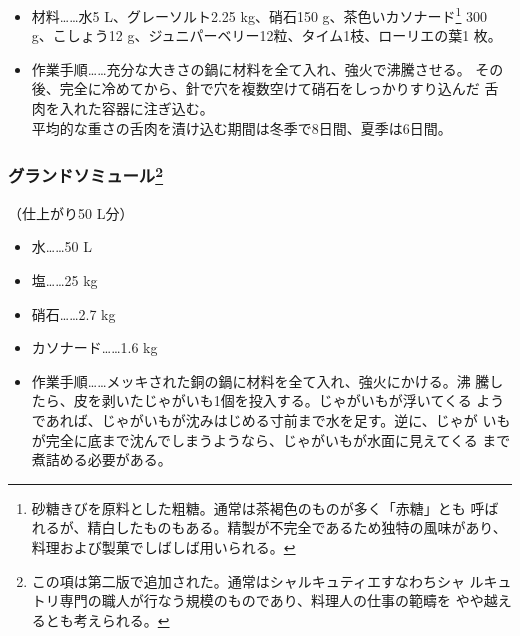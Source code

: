 \begin{recette}


\begin{itemize}
\item
  材料\ldots{}\ldots{}水5 L、グレーソルト2.25 kg、硝石150
  g、茶色いカソナード\footnote{砂糖きびを原料とした粗糖。通常は茶褐色のものが多く「赤糖」とも
    呼ばれるが、精白したものもある。精製が不完全であるため独特の風味があり、
    料理および製菓でしばしば用いられる。} 300 g、こしょう12
  g、ジュニパーベリー12粒、タイム1枝、ローリエの葉1 枚。
\item
  作業手順\ldots{}\ldots{}充分な大きさの鍋に材料を全て入れ、強火で沸騰させる。
  その後、完全に冷めてから、針で穴を複数空けて硝石をしっかりすり込んだ
  舌肉を入れた容器に注ぎ込む。\\
  平均的な重さの舌肉を漬け込む期間は冬季で8日間、夏季は6日間。
\end{itemize}

\hypertarget{grande-saumure}{%
\subsubsection[グランドソミュール]{\texorpdfstring{グランドソミュール\footnote{この項は第二版で追加された。通常はシャルキュティエすなわちシャ
  ルキュトリ専門の職人が行なう規模のものであり、料理人の仕事の範疇を
  やや越えるとも考えられる。}}{グランドソミュール}}\label{grande-saumure}}



（仕上がり50 L分）

\begin{itemize}
\tightlist
\item
  水\ldots{}\ldots{}50 L
\item
  塩\ldots{}\ldots{}25 kg
\item
  硝石\ldots{}\ldots{}2.7 kg
\item
  カソナード\ldots{}\ldots{}1.6 kg
\item
  作業手順\ldots{}\ldots{}メッキされた銅の鍋に材料を全て入れ、強火にかける。沸
  騰したら、皮を剥いたじゃがいも1個を投入する。じゃがいもが浮いてくる
  ようであれば、じゃがいもが沈みはじめる寸前まで水を足す。逆に、じゃが
  いもが完全に底まで沈んでしまうようなら、じゃがいもが水面に見えてくる
  まで煮詰める必要がある。
\end{itemize}


\end{recette}

